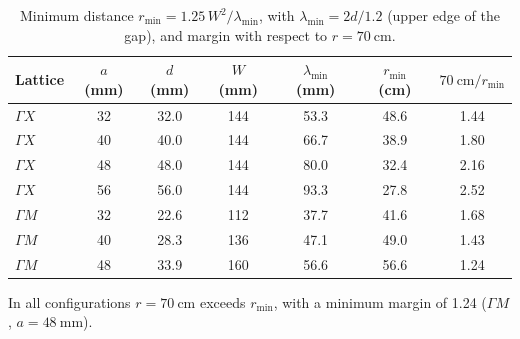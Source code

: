 \documentclass[9pt,a4paper,twocolumn]{extarticle}
\begin{document}
\begin{table}[htbp]
  \centering
  \caption{Minimum distance $r_{\min} = 1.25\,W^2/\lambda_{\min}$, with $\lambda_{\min} = 2d/1.2$ (upper edge of the gap), and margin with respect to $r = \SI{70}{\centi\metre}$.}
  \label{tab:B1}
  \begin{tabular}{l S[table-format=2.0] S[table-format=2.1] S[table-format=3.0] S[table-format=2.1] S[table-format=2.1] S[table-format=1.2]}
    \toprule
    {Lattice} & {$a$ (mm)} & {$d$ (mm)} & {$W$ (mm)} & {$\lambda_{\min}$ (mm)} & {$r_{\min}$ (cm)} & {$\SI{70}{\centi\metre}/r_{\min}$} \\
    \midrule
    $\Gamma X$ & 32 & 32.0 & 144 & 53.3 & 48.6 & 1.44 \\
    $\Gamma X$ & 40 & 40.0 & 144 & 66.7 & 38.9 & 1.80 \\
    $\Gamma X$ & 48 & 48.0 & 144 & 80.0 & 32.4 & 2.16 \\
    $\Gamma X$ & 56 & 56.0 & 144 & 93.3 & 27.8 & 2.52 \\
    $\Gamma M$ & 32 & 22.6 & 112 & 37.7 & 41.6 & 1.68 \\
    $\Gamma M$ & 40 & 28.3 & 136 & 47.1 & 49.0 & 1.43 \\
    $\Gamma M$ & 48 & 33.9 & 160 & 56.6 & 56.6 & 1.24 \\
    \bottomrule
  \end{tabular}
\end{table}

In all configurations $r = \SI{70}{\centi\metre}$ exceeds $r_{\min}$, with a minimum margin of 1.24 ($\Gamma M$, $a = \SI{48}{\milli\metre}$).
\end{document}
